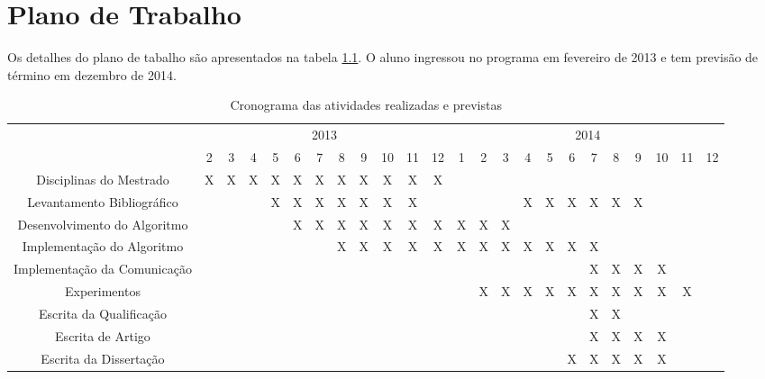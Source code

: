 \pagestyle{empty}
\cleardoublepage
\pagestyle{fancy}

\onehalfspacing

\chapter{Plano de Trabalho}\label{cap7}


Os detalhes do plano de tabalho são apresentados na tabela \ref{t_cronograma}. O aluno
ingressou no programa em fevereiro de 2013 e tem previsão de término em dezembro
de 2014.

\begin{table}[!htpb]
\centering

\begin{small}

\setlength{\tabcolsep}{2pt}

\begin{tabular}{|c|c|c|c|c|c|c|c|c|c|c|c|c|c|c|c|c|c|c|c|c|c|c|c|} \hline

 & \multicolumn{11}{c|}{2013}  & \multicolumn{12}{c|}{2014}   \\ \cline{2-22}
\raisebox{1.5ex}{Etapa} & 2 & 3 & 4  & 5 & 6 & 7 & 8 & 9 & 10 & 11 & 12 & 1 & 2 & 3 & 4 & 5 & 6 & 7 & 8 & 9 & 10 & 11 & 12 \\ \hline

Disciplinas do Mestrado & X & X & X & X & X & X & X & X & X & X & X & & & & & & & & & & & & \\ \hline
Levantamento Bibliográfico &  &  &  & X & X & X & X & X & X & X & & & & & X & X & X & X & X & X & & & \\ \hline
Desenvolvimento do Algoritmo & & & & & X & X & X & X & X & X & X & X & X & X & & & & & & & & & \\ \hline
Implementação do Algoritmo & & & & & & & X & X & X & X & X & X & X & X & X & X & X & X & & & & & \\ \hline
Implementação da Comunicação & & & & & & &  &  & &  &  &  &  &  & &  &  & X & X & X & X & & \\ \hline
Experimentos & & & & & & & & & & & & & X & X & X & X & X & X & X & X & X & X & \\ \hline
Escrita da Qualificação & & &  & & & & & & & & & &  &  & & & & X & X & & & & \\ \hline
Escrita de Artigo & & & & & & & & & & & & & & & & & & X & X & X & X & & \\ \hline
Escrita da Dissertação & & & & & &  & & & & & & & & & & & X & X & X & X & X &  &  \\ \hline

\end{tabular}
\end{small}
\caption{Cronograma das atividades realizadas e previstas}
\label{t_cronograma}
\end{table}

